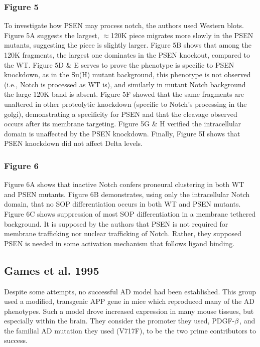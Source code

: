 \subsubsection*{Figure 5}
To investigate how PSEN may process notch, the authors used Western blots. Figure 5A suggests the largest, $\approx$120K piece migrates more slowly in the PSEN mutants, suggesting the piece is slightly larger. Figure 5B shows that among the 120K fragments, the largest one dominates in the PSEN knockout, compared to the WT. Figure 5D \& E serves to prove the phenotype is specific to PSEN knockdown, as in the Su(H) mutant background, this phenotype is not observed (i.e., Notch is processed as WT is), and similarly in mutant Notch background the large 120K band is absent. Figure 5F showed that the same fragments are unaltered in other proteolytic knockdown (specific to Notch's processing in the golgi), demonstrating a specificity for PSEN and that the cleavage observed occurs after its membrane targeting. Figure 5G \& H verified the intracellular domain is unaffected by the PSEN knockdown. Finally, Figure 5I shows that PSEN knockdown did not affect Delta levels. 

\subsubsection*{Figure 6}
Figure 6A shows that inactive Notch confers proneural clustering in both WT and PSEN mutants. Figure 6B demonstrates, using only the intracellular Notch domain, that no SOP differentiation occurs in both WT and PSEN mutants. Figure 6C shows suppression of most SOP differentiation in a membrane tethered background. It is supposed by the authors that PSEN is not required for membrane trafficking nor nuclear trafficking of Notch. Rather, they supposed PSEN is needed in some activation mechanism that follows ligand binding.  

\subsection*{Games et al. 1995}

Despite some attempts, no successful AD model had been established. This group used a modified, transgenic APP gene in mice which reproduced many of the AD phenotypes. Such a model drove increased expression in many mouse tissues, but especially within the brain. They consider the promoter they used, PDGF-$\beta$, and the familial AD mutation they used (V717F), to be the two prime contributors to success. 


